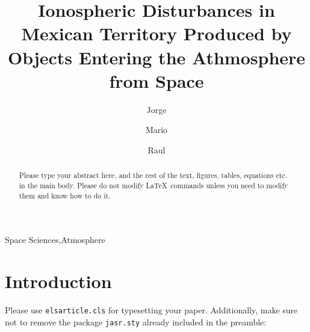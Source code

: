 \documentclass[times,twocolumn,final,authoryear]{elsarticle}
\begin{document}

\begin{frontmatter}

\title{Ionospheric Disturbances in Mexican Territory Produced by Objects Entering the Athmosphere from Space }%

\author[1]{Jorge }

\author[1]{Mario }
\author[1]{Raul }

\address[1]{Escuela Nacional de Estudios Superiores, UNAM, campus Morelia, Antigua Carretera a P\'atzcuaro No. 8701
Col. Ex Hacienda de San Jos\'e de la Huerta, Morelia, Michoac\'an, 58190, M\'exico}



\begin{abstract}
Please type your abstract here, and the rest of the text, figures,
tables, equations etc. in the main body. Please do not modify LaTeX\ 
commands unless you need to modify them and know how to do it.
\end{abstract}

\begin{keyword}
\KWD Space Sciences\sep Atmosphere%
\end{keyword}

\end{frontmatter}


\section{Introduction}
\label{sec1}
Please use \verb+elsarticle.cls+ for typesetting your paper. Additionally,
make sure not to remove the package \verb+jasr.sty+ already included in the
preamble:
\end{document}
